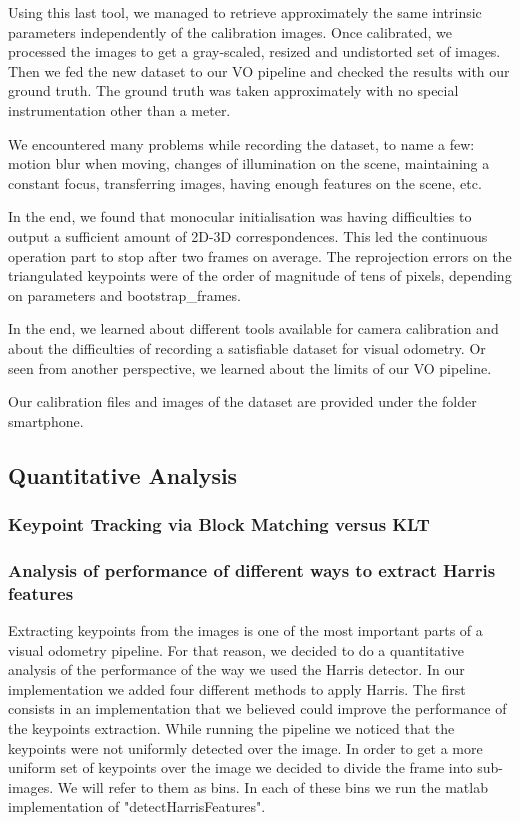 Using this last tool, we managed to retrieve approximately the same intrinsic parameters independently of the calibration images.
Once calibrated, we processed the images to get a gray-scaled, resized and undistorted set of images. Then we fed the new
dataset to our VO pipeline and checked the results with our ground truth.
The ground truth was taken approximately with no special instrumentation other than a meter.

We encountered many problems while recording the dataset, to name a few: motion blur when moving, changes of illumination on the scene,
maintaining a constant focus, transferring images, having enough features on the scene, etc.

In the end, we found that monocular initialisation was having difficulties to output a sufficient amount of 2D-3D correspondences.
This led the continuous operation part to stop after two frames on average. The reprojection errors on the triangulated keypoints were of
the order of magnitude of tens of pixels, depending on parameters and bootstrap\_frames.

In the end, we learned about different tools available for camera calibration and about the difficulties of recording a satisfiable dataset
for visual odometry. Or seen from another perspective, we learned about the limits of our VO pipeline.

Our calibration files and images of the dataset are provided under the folder smartphone.








\subsection{Quantitative Analysis}
\subsubsection{Keypoint Tracking via Block Matching versus KLT}

\subsubsection{Analysis of performance of different ways to extract Harris features}
Extracting keypoints from the images is one of the most important parts of a visual odometry pipeline. For that reason, we
decided to do a quantitative analysis of the performance of the way we used the Harris detector.
In our implementation we added four different methods to apply Harris.
The first consists in an implementation that we believed could improve the performance of the keypoints extraction.
While running the pipeline we noticed that the keypoints were not uniformly detected over the image.
In order to get a more uniform set of keypoints over the image we decided to divide the frame into sub-images. We will refer to them
as bins. In each of these bins we run the matlab implementation of "detectHarrisFeatures".

